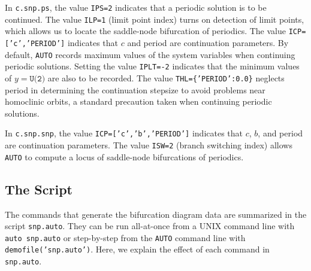 \documentclass[a4paper,11pt]{article}
\begin{document}
\noindent
In \texttt{c.snp.ps}, the value \texttt{IPS=2} indicates that a periodic solution is to be continued. The value \texttt{ILP=1} (limit point index) turns on detection of limit points, which allows us to locate the saddle-node bifurcation of periodics. The value \texttt{ICP=['c','PERIOD']} indicates that $c$ and period are continuation parameters. By default, \texttt{AUTO} records maximum values of the system variables when continuing periodic solutions. Setting the value \texttt{IPLT=-2} indicates that the minimum values of $y=\texttt{U(2)}$ are also to be recorded. The value \texttt{THL=\{'PERIOD':0.0\}} neglects period in determining the continuation stepsize to avoid problems near homoclinic orbits, a standard precaution taken when continuing periodic solutions.\vspace{3mm}

\noindent
In \texttt{c.snp.snp}, the value \texttt{ICP=['c','b','PERIOD']} indicates that $c$, $b$, and period are continuation parameters. The value \texttt{ISW=2} (branch switching index) allows \texttt{AUTO} to compute a locus of saddle-node bifurcations of periodics.

\subsection*{The  Script}

\noindent
The commands that generate the bifurcation diagram data are summarized in the script \texttt{snp.auto}. They can be run all-at-once from a UNIX command line with \texttt{auto snp.auto} or step-by-step from the \texttt{AUTO} command line with \texttt{demofile('snp.auto')}. Here, we explain the effect of each command in \texttt{snp.auto}.\vspace{3mm}
\end{document}
